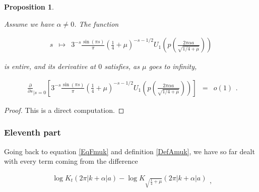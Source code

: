 \documentclass{jams-l}
\newtheorem{proposition}[theorem]{Proposition}
\theoremstyle{definition}
\theoremstyle{remark}
\numberwithin{equation}{section}
\begin{document}
            \begin{proposition}
            \label{PropA10-0}
            
                Assume we have $\alpha \neq 0$. The function
                
                \[ \begin{array}{lll}
                        s & \longmapsto & 3^{-s} \frac{\sin \left( \pi s \right)}{\pi} \left( \frac{1}{4} + \mu \right)^{-s-1/2} U_1 \left( p \left( \frac{2 \pi \alpha a}{\sqrt{1/4 + \mu}} \right) \right)
                    \end{array} \]
                
                \noindent is entire, and its derivative at $0$ satisfies, as $\mu$ goes to infinity,
                
                \[ \begin{array}{lll}
                        \scriptstyle \frac{\partial}{\partial s}_{\left \vert s = 0 \right.} \left[ 3^{-s} \frac{\sin \left( \pi s \right)}{\pi} \left( \frac{1}{4} + \mu \right)^{-s-1/2} U_1 \left( p \left( \frac{2 \pi \alpha a}{\sqrt{1/4 + \mu}} \right) \right) \right] & \scriptstyle = & \scriptstyle o \left( 1 \right)
                    \end{array} . \]
            
            \end{proposition}
            
            \begin{proof}
            
                This is a direct computation.
            
            \end{proof}
            
            
        \subsubsection*{\textbf{Eleventh part}}
        \label{AEleventhPart}
            
            Going back to equation \eqref{EqFmuk} and definition \ref{DefAmuk}, we have so far dealt with every term coming from the difference
            
            \[ \begin{array}{c}
                    \log K_t \left( 2 \pi \left \vert k + \alpha \right \vert a \right) - \log K_{\sqrt{\frac{1}{4} + \mu}} \left( 2 \pi \left \vert k + \alpha \right \vert a \right)
                \end{array} , \]
            
\end{document}
